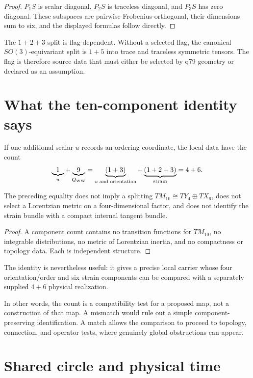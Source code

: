 \documentclass[11pt]{article}
\begin{document}
\begin{proof}
$P_1S$ is scalar diagonal, $P_2S$ is traceless diagonal, and $P_3S$ has zero
diagonal.  These subspaces are pairwise Frobenius-orthogonal, their dimensions
sum to six, and the displayed formulas follow directly.
\end{proof}

The $1+2+3$ split is flag-dependent.  Without a selected flag, the canonical
$SO(3)$-equivariant split is $1+5$ into trace and traceless symmetric tensors.
The flag is therefore source data that must either be selected by q79 geometry
or declared as an assumption.

\section{What the ten-component identity says}

If one additional scalar $u$ records an ordering coordinate, the local data
have the count
\[
 \underbrace{1}_{u}
 +\underbrace{9}_{Q_{\rm WW}}
 =\underbrace{(1+3)}_{u\;\text{and orientation}}
 +\underbrace{(1+2+3)}_{\text{strain}}
 =4+6.
\]

\begin{proposition}
The preceding equality does not imply a splitting
$TM_{10}\cong TY_4\oplus TX_6$, does not select a Lorentzian metric on a
four-dimensional factor, and does not identify the strain bundle with a
compact internal tangent bundle.
\end{proposition}

\begin{proof}
A component count contains no transition functions for $TM_{10}$, no
integrable distributions, no metric of Lorentzian inertia, and no compactness
or topology data.  Each is independent structure.
\end{proof}

The identity is nevertheless useful: it gives a precise local carrier whose
four orientation/order and six strain components can be compared with a
separately supplied $4+6$ physical realization.

In other words, the count is a compatibility test for a proposed map, not a
construction of that map.  A mismatch would rule out a simple
component-preserving identification.  A match allows the comparison to
proceed to topology, connection, and operator tests, where genuinely global
obstructions can appear.

\section{Shared circle and physical time}
\end{document}
